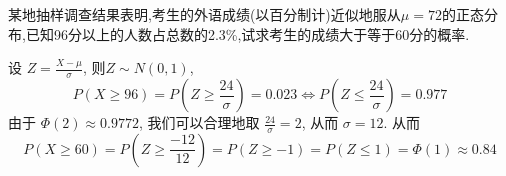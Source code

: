 \documentclass[../main.tex]{subfiles}
\begin{document}
\begin{exercise}{}{}
某地抽样调查结果表明,考生的外语成绩(以百分制计)近似地服从$\mu=72$的正态分布,已知96分以上的人数占总数的2.3\%,试求考生的成绩大于等于60分的概率.
\end{exercise}
\begin{solution}
    设 \(  Z= \frac{X-\mu  }{ \sigma  }   \), 则\(  Z\sim N\left( 0,1 \right)   \),  \[
    P\left( X\ge 96 \right)= P\left( Z\ge \frac{24 }{ \sigma  }  \right)= 0.023  \iff P\left( Z\le \frac{24 }{ \sigma  }  \right)= 0.977 
    \]由于 \(  \Phi \left( 2 \right)\approx 0.9772   \), 我们可以合理地取 \(  \frac{24 }{ \sigma  }= 2   \), 从而 \(   \sigma = 12  \). 从而 \[
    P\left( X\ge 60 \right)=  P\left( Z\ge \frac{-12 }{12 }  \right)= P\left( Z\ge -1 \right)=   P\left( Z\le 1 \right)= \Phi \left( 1 \right)  \approx 0.84
    \]
\end{solution}
\end{document}
